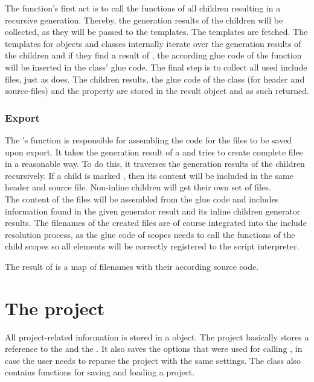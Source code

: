 The  function's first act is to call the  functions of all children resulting in a recursive generation. Thereby, the generation results of the children will be collected, as they will be passed to the templates. The templates are fetched. The templates for objects and classes internally iterate over the generation results of the children and if they find a result of  , the according glue code of the function will be inserted in the class' glue code.
The final step is to collect all used include files, just as  does.  The children results, the glue code  of the class (for header and source-files) and the  property are stored in the result object and as such returned.

\subsubsection{Export}

The 's  function is responsible for assembling the code for the files to be saved upon export. It takes the generation result of a \linebreak{} and tries to create complete files in a reasonable way. To do this, it traverses the generation results of the children recursively. If a child is marked , then its content will be included in the same header and source file. Non-inline children will get their own set of files.\\
The content of the files will be assembled from the glue code and includes information found in the given generator result and its inline children generator results. The filenames of the created files are of course integrated into the include resolution process, as the glue code of scopes needs to call the  functions of the child scopes so all elements will be correctly registered to the script interpreter.

The result of  is a map of filenames with their according source code.

\section{The project}
\label{sec:Project}

All project-related information is stored in a  object. The project basically stores a reference to the  and the . It also saves the options that were used for calling , in case the user needs to reparse the project with the same settings. The  class also contains functions for saving and loading a project.

